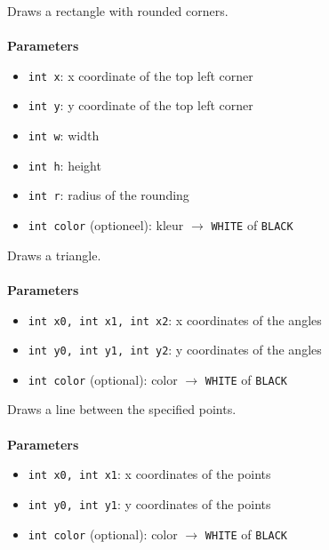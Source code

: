 \documentclass[11pt,fleqn]{book} %
\begin{document}
\begin{libf}[drawRoundRect(x, y, w, h, r, \emph{color=WHITE})]
	Draws a rectangle with rounded corners.\\ \\
	\textbf{Parameters}
	\begin{itemize}
		\item \texttt{int x}: x coordinate of the top left corner
		\item \texttt{int y}: y coordinate of the top left corner
		\item \texttt{int w}: width
		\item \texttt{int h}: height
		\item \texttt{int r}: radius of the rounding
		\item \texttt{int color} (optioneel): kleur $\rightarrow$ \texttt{WHITE} of \texttt{BLACK}
	\end{itemize}
\end{libf}

\begin{libf}[drawTriangle(x0, y0, x1, y1, x2, y2, \emph{color=WHITE})]
	Draws a triangle.\\ \\
	\textbf{Parameters}
	\begin{itemize}
		\item \texttt{int x0, int x1, int x2}: x coordinates of the angles
		\item \texttt{int y0, int y1, int y2}: y coordinates of the angles
		\item \texttt{int color} (optional): color $\rightarrow$ \texttt{WHITE} of \texttt{BLACK}
	\end{itemize}
\end{libf}

\newpage

\begin{libf}[drawLine(x0, y0, x1, y1, \emph{color=WHITE})]
	Draws a line between the specified points.\\ \\
	\textbf{Parameters}
	\begin{itemize}
		\item \texttt{int x0, int x1}: x coordinates of the points
		\item \texttt{int y0, int y1}: y coordinates of the points
		\item \texttt{int color} (optional): color $\rightarrow$ \texttt{WHITE} of \texttt{BLACK}
	\end{itemize}
\end{libf}
\end{document}
